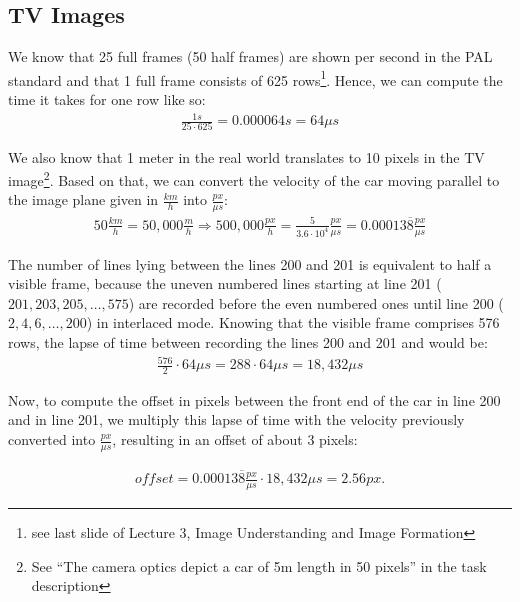 \documentclass[a4paper,12pt]{article}
\begin{document}
		
	\subsection{TV Images}
	We know that 25 full frames (50 half frames) are shown per second in the PAL standard and that 1 full frame consists of 625 rows\footnote{see last slide of Lecture 3, Image Understanding and Image Formation}. Hence, we can compute the time it takes for one row like so:
	\begin{align*}
		\frac{1 s}{25 \cdot 625} = 0.000064 s = 64\mu s
	\end{align*}
	
	We also know that 1 meter in the real world translates to 10 pixels in the TV image\footnote{See ``The camera optics depict a car of 5m length in 50 pixels'' in the task description}. Based on that, we can convert the velocity of the car moving parallel to the image plane given in $\frac{km}{h}$ into $\frac{px}{\mu s}$:
	\begin{align*}
		50 \frac{km}{h} = 50,000 \frac{m}{h} \Rightarrow 500,000 \frac{px}{h} = \frac{5}{3.6 \cdot 10^{4}} \frac{px}{\mu s} = 0.00013\overline{8} \frac{px}{\mu s}
	\end{align*}
	
	The number of lines lying between the lines 200 and 201 is equivalent to half a visible frame, because the uneven numbered lines starting at line 201 ($201, 203, 205, \dots, 575$) are recorded before the even numbered ones until line 200 ($2, 4, 6, \dots, 200$) in interlaced mode. Knowing that the visible frame comprises 576 rows, the lapse of time between recording the lines 200 and 201 and would be:
	\begin{align*}
	\frac{576}{2} \cdot 64\mu s = 288 \cdot 64\mu s = 18,432 \mu s
	\end{align*}
	
	Now, to compute the offset in pixels between the front end of the car in line 200 and in line 201, we multiply this lapse of time with the velocity previously converted into $\frac{px}{\mu s}$, resulting in an offset of about 3 pixels:
	
	\begin{align*}
	\mathit{offset} = 0.00013\overline{8} \frac{px}{\mu s} \cdot 18,432 \mu s = 2.56 px.
	\end{align*}
	
\end{document}
